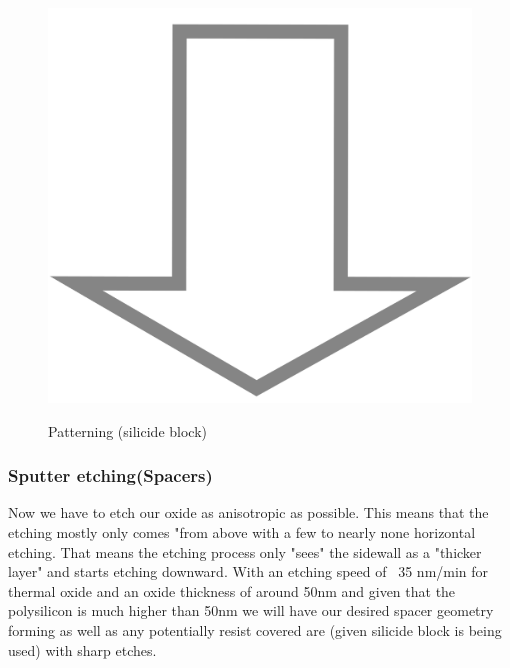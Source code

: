\begin{figure}[H]
	\centering
	\begin{tikzpicture}[node distance = 3cm, auto, thick,scale=\CrossSectionOnly, every node/.style={transform shape}]
		
	\end{tikzpicture}\\
	\includegraphics[scale=0.01]{down_arrow.png}\\
	\begin{tikzpicture}[node distance = 3cm, auto, thick,scale=\CrossSectionOnly, every node/.style={transform shape}]
		
	\end{tikzpicture}
	\caption{Patterning (silicide block)}
\end{figure}

\subsubsection{Sputter etching(Spacers)}

Now we have to etch our oxide as anisotropic as possible. This means that the etching mostly only comes "from above with a few to nearly none horizontal etching.
That means the etching process only "sees" the sidewall as a "thicker layer" and starts etching downward.
With an etching speed of ~35 nm/min for thermal oxide and an oxide thickness of around 50nm and given that the polysilicon is much higher than 50nm we will have our desired spacer geometry forming as well as any potentially resist covered are (given silicide block is being used) with sharp etches.

